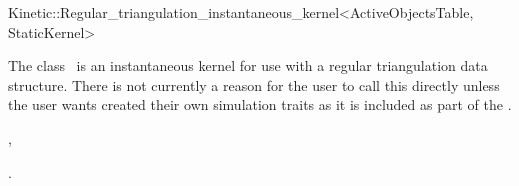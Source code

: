 

\begin{ccRefClass}{Kinetic::Regular_triangulation_instantaneous_kernel<ActiveObjectsTable, StaticKernel>}


\ccDefinition
  
The class \ccRefName\ is an instantaneous kernel for use with a
regular triangulation data structure. There is not currently a reason
for the user to call this directly unless the user wants created their
own simulation traits as it is included as part of the
.


\ccIsModel

, 

\ccSeeAlso

.

\end{ccRefClass}


